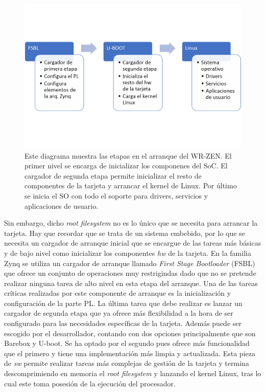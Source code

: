 \begin{figure}
	\centering
	\includegraphics[width=0.7\linewidth]{imagenes/cargazen}
	\caption[Diagrama de flujo del arranque del WR-ZEN]{Este diagrama muestra 
	las etapas en el arranque del WR-ZEN. El primer nivel se encarga de 
	inicializar los componenes del SoC. El cargador de segunda etapa permite 
	inicializar el resto de componentes de la tarjeta y arrancar el kernel de 
	Linux. Por último se inicia el SO con todo el soporte para drivers, 
	servicios y aplicaciones de usuario.}
	\label{fig:cargazen}
\end{figure}


Sin embargo, dicho \textit{root filesystem} no es lo único que se necesita para 
arrancar la tarjeta. Hay que recordar que se trata de un sistema embebido, por 
lo que se necesita un cargador de arranque inicial que se encargue de las 
tareas más básicas y de bajo nivel como inicializar los componentes \textit{hw} 
de la tarjeta. En la familia Zynq se utiliza un cargador de arranque llamado 
\textit{First Stage Bootloader} (FSBL) que ofrece un conjunto de operaciones 
muy restrigindas dado que no se pretende realizar ninguna tarea de alto nivel 
en esta etapa del arranque. Una de las tareas críticas realizadas por este 
componente de arranque es la inicialización y configuración de la parte PL. La 
última tarea que debe realizar es lanzar un cargador de segunda etapa que ya 
ofrece más flexibilidad a la hora de ser configurado para las necesidades 
específicas de la tarjeta. Además puede ser escogido por el desarrollador, 
contando con dos opciones principalmente que son Barebox y U-boot. Se ha optado 
por el segundo pues ofrece más funcionalidad que el primero y tiene una 
implementación más limpia y actualizada. Esta pieza de \textit{sw} permite 
realizar tareas más complejas de gestión de la tarjeta y termina 
descomprimiendo en memoria el \textit{root filesystem} y lanzando el kernel 
Linux, tras lo cual este toma posesión de la ejecución del procesador.

